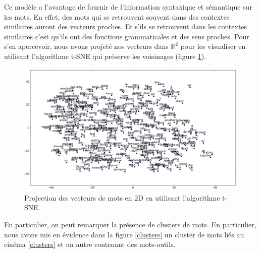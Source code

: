 \documentclass{article}
\begin{document}
Ce modèle a l'avantage de fournir de l'information syntaxique et sémantique sur les mots. En effet, des mots qui se retrouvent souvent dans des contextes similaires auront des vecteurs proches. Et s'ils se retrouvent dans les contextes similaires c'est qu'ils ont des fonctions grammaticales et des sens proches. Pour s'en apercevoir, nous avons projeté nos vecteurs dans $\mathbb{R}^{2}$ pour les visualiser en utilisant l'algorithme t-SNE \cite{van2008visualizing} qui préserve les voisinages (figure \ref{tsne_plot}).

\begin{figure}[h]
\begin{center}
\includegraphics[scale=0.35]{images/tsne_plot.png}
\caption{Projection des vecteurs de mots en 2D en utilisant l'algorithme t-SNE.}
\label{tsne_plot}
\end{center}
\end{figure}

En particulier, on peut remarquer la présence de clusters de mots. En particulier, nous avons mis en évidence dans la figure \ref{clusters} un cluster de mots liés au cinéma \ref{clusters} et un autre contenant des mots-outils.
\end{document}
